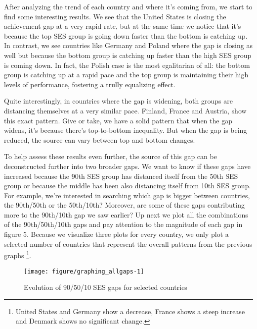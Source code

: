 \documentclass[11pt, a4paper]{article}\usepackage[]{graphicx}\usepackage[]{color}
\begin{document}
After analyzing the trend of each country and where it's coming from, we start to find some interesting results. We see that the United States is closing the achievement gap at a very rapid rate, but at the same time we notice that it's because the top SES group is going down faster than the bottom is catching up. In contrast, we see countries like Germany and Poland where the gap is closing as well but because the bottom group is catching up faster than the high SES group is coming down. In fact, the Polish case is the most egalitarian of all: the bottom group is catching up at a rapid pace and the top group is maintaining their high levels of performance, fostering a trully equalizing effect.

Quite interestingly, in countries where the gap is widening, both groups are distancing themselves at a very similar pace. Finland, France and Austria, show this exact pattern. Give or take, we have a solid pattern that when the gap widens, it's because there's top-to-bottom inequality. But when the gap is being reduced, the source can vary between top and bottom changes.

To help assess these results even further, the source of this gap can be deconstructed further into two broader gaps. We want to know if these gaps have increased because the 90th SES group has distanced itself from the 50th SES group or because the middle has been also distancing itself from 10th SES group. For example, we're interested in searching which gap is bigger between countries, the 90th/50th or the 50th/10th? Moreover, are some of these gaps contributing more to the 90th/10th gap we saw earlier? Up next we plot all the combinations of the 90th/50th/10th gaps and pay attention to the magnitude of each gap in figure 5. Because we visualize three plots for every country, we only plot a selected number of countries that represent the overall patterns from the previous graphs \footnote{United States and Germany show a decrease, France shows a steep increase and Denmark shows no significant change.}.

\begin{figure}

{\centering \texttt{[image: figure/graphing\_allgaps-1]} 

}

\caption[Evolution of 90/50/10 SES gaps for selected countries]{Evolution of 90/50/10 SES gaps for selected countries}\label{fig:graphing_allgaps}
\end{figure}
\end{document}
